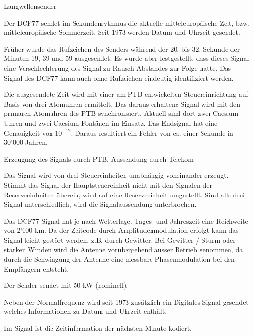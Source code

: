 Langwellensender

Der DCF77 sendet im Sekundenrythmus die aktuelle mitteleuropäische Zeit, bzw. mitteleuropäische Sommerzeit. Seit 1973 werden Datum und Uhrzeit gesendet.

Früher wurde das Rufzeichen des Senders während der 20. bis 32. Sekunde der Minuten 19, 39 und 59 ausgesendet. Es wurde aber festgestellt, dass dieses Signal eine Verschlechterung des Signal-zu-Rausch-Abstandes zur Folge hatte. Das Signal des DCF77 kann auch ohne Rufzeichen eindeutig identifiziert werden.

Die ausgesendete Zeit wird mit einer am PTB entwickelten Steuereinrichtung auf Basis von drei Atomuhren ermittelt. Das daraus erhaltene Signal wird mit den primären Atomuhren des PTB synchronisiert. Aktuell sind dort zwei Caesium-Uhren und zwei Caesium-Fontänen im Einsatz. Das Endsignal hat eine Genauigkeit von $10^{-12}$. Daraus resultiert ein Fehler von ca. einer Sekunde in 30'000 Jahren.

Erzeugung des Signals durch PTB, Aussendung durch Telekom


Das Signal wird von drei Steuereinheiten unabhängig voneinander erzeugt. Stimmt das Signal der Hauptsteuereinheit nicht mit den Signalen der Reserveeinheiten überein, wird auf eine Reserveeinheit umgestellt. Sind alle drei Signal unterschiedlich, wird die Signalaussendung unterbrochen.

Das DCF77 Signal hat je nach Wetterlage, Tages- und Jahreszeit eine Reichweite von 2'000 km. Da der Zeitcode durch Amplitudenmodulation erfolgt kann das Signal leicht gestört werden, z.B. durch Gewitter. Bei Gewitter / Sturm oder starken Winden wird die Antenne vorübergehend ausser Betrieb genommen, da durch die Schwingung der Antenne eine messbare Phasenmodulation bei den Empfängern entsteht.

Der Sender sendet mit 50 kW (nominell).

Neben der Normalfrequenz wird seit 1973 zusätzlich ein Digitales Signal gesendet welches Informationen zu Datum und Uhrzeit enthält.

Im Signal ist die Zeitinformation der nächsten Minute kodiert. 
